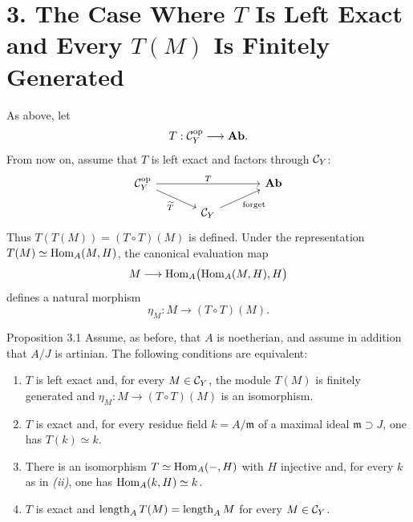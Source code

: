 
\section*{3. The Case Where $T$ Is Left Exact and Every $T(M)$ Is Finitely Generated}

As above, let
\[
  T:\mathcal C_Y^{\mathrm{op}}\longrightarrow\mathbf{Ab}.
\]
From now on, assume that $T$ is left exact and factors through
$\mathcal C_Y$:
\[
\begin{tikzcd}[column sep=large,row sep=small]
\Ccat_Y^{\mathrm{op}} \arrow[rr,"T"] \arrow[dr,swap,"\widetilde T"]
  && \Ab \\
& \Ccat_Y \arrow[ur,swap,"\text{forget}"] &
\end{tikzcd}
\]
Thus $T(T(M))=(T\circ T)(M)$ is defined. Under the representation
$T(M)\simeq\operatorname{Hom}_A(M,H)$, the canonical evaluation map
\[
  M\longrightarrow
  \operatorname{Hom}_A\bigl(\operatorname{Hom}_A(M,H),H\bigr)
\]
defines a natural morphism
\[
  \eta_M:M\longrightarrow (T\circ T)(M).
\]

\begin{sgastatement}{Proposition 3.1}
Assume, as before, that $A$ is noetherian, and assume in addition that
$A/J$ is artinian. The following conditions are equivalent:
\begin{enumerate}[label=\textup{\roman*)},leftmargin=2.7em]
\item $T$ is left exact and, for every $M\in\mathcal C_Y$, the module $T(M)$
is finitely generated and $\eta_M:M\to(T\circ T)(M)$ is an isomorphism.

\item $T$ is exact and, for every residue field $k=A/\mathfrak m$ of a
maximal ideal $\mathfrak m\supset J$, one has $T(k)\simeq k$.

\item There is an isomorphism
$T\simeq\operatorname{Hom}_A(-,H)$ with $H$ injective and, for every $k$ as in
\emph{(ii)}, one has $\operatorname{Hom}_A(k,H)\simeq k$.

\item $T$ is exact and $\operatorname{length}_A T(M)=\operatorname{length}_A M$ for every $M\in\mathcal C_Y$.
\end{enumerate}
\end{sgastatement}

